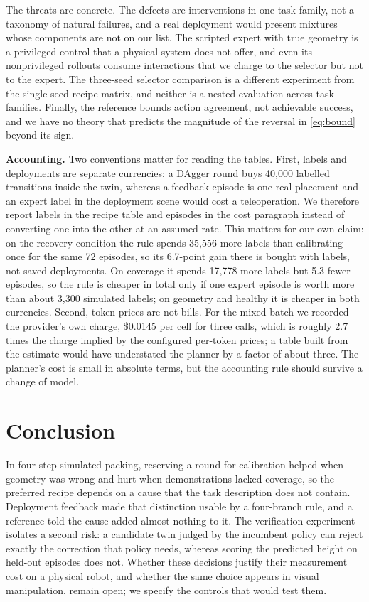 \documentclass[conference]{IEEEtran}
\begin{document}
The threats are concrete. The defects are interventions in one task family, not a taxonomy of natural failures, and a real deployment would present mixtures whose components are not on our list. The scripted expert with true geometry is a privileged control that a physical system does not offer, and even its nonprivileged rollouts consume interactions that we charge to the selector but not to the expert. The three-seed selector comparison is a different experiment from the single-seed recipe matrix, and neither is a nested evaluation across task families. Finally, the reference bounds action agreement, not achievable success, and we have no theory that predicts the magnitude of the reversal in \eqref{eq:bound} beyond its sign.

\textbf{Accounting.} Two conventions matter for reading the tables. First, labels and deployments are separate currencies: a DAgger round buys 40,000 labelled transitions inside the twin, whereas a feedback episode is one real placement and an expert label in the deployment scene would cost a teleoperation. We therefore report labels in the recipe table and episodes in the cost paragraph instead of converting one into the other at an assumed rate. This matters for our own claim: on the recovery condition the rule spends 35,556 more labels than calibrating once for the same 72 episodes, so its 6.7-point gain there is bought with labels, not saved deployments. On coverage it spends 17,778 more labels but 5.3 fewer episodes, so the rule is cheaper in total only if one expert episode is worth more than about 3,300 simulated labels; on geometry and healthy it is cheaper in both currencies. Second, token prices are not bills. For the mixed batch we recorded the provider's own charge, \$0.0145 per cell for three calls, which is roughly 2.7 times the charge implied by the configured per-token prices; a table built from the estimate would have understated the planner by a factor of about three. The planner's cost is small in absolute terms, but the accounting rule should survive a change of model.

\section{Conclusion}
In four-step simulated packing, reserving a round for calibration helped when geometry was wrong and hurt when demonstrations lacked coverage, so the preferred recipe depends on a cause that the task description does not contain. Deployment feedback made that distinction usable by a four-branch rule, and a reference told the cause added almost nothing to it. The verification experiment isolates a second risk: a candidate twin judged by the incumbent policy can reject exactly the correction that policy needs, whereas scoring the predicted height on held-out episodes does not. Whether these decisions justify their measurement cost on a physical robot, and whether the same choice appears in visual manipulation, remain open; we specify the controls that would test them.

\clearpage


\end{document}
